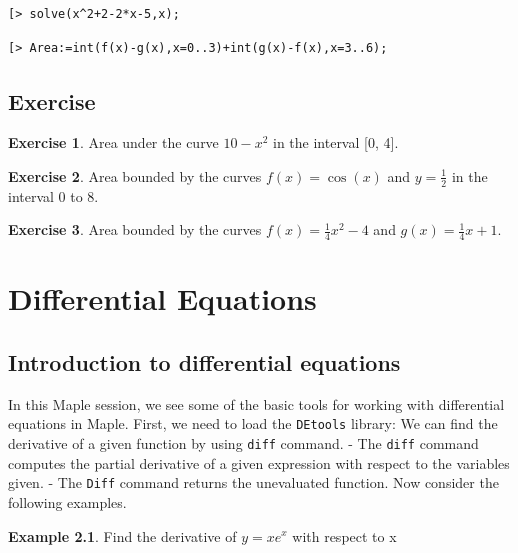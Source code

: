 \documentclass[
]{book}
\theoremstyle{definition}
\theoremstyle{definition}
\newtheorem{example}{Example}[chapter]
\theoremstyle{definition}
\newtheorem{exercise}{Exercise}[chapter]
\theoremstyle{definition}
\theoremstyle{remark}
\begin{document}
\begin{verbatim}
[> solve(x^2+2-2*x-5,x);
\end{verbatim}

\begin{verbatim}
[> Area:=int(f(x)-g(x),x=0..3)+int(g(x)-f(x),x=3..6);
\end{verbatim}

\section{Exercise}\label{exercise-5}

\begin{exercise}
\protect\hypertarget{exr:unnamed-chunk-32}{}\label{exr:unnamed-chunk-32}Area under the curve \(10 - x^2\) in the interval {[}0, 4{]}.
\end{exercise}

\begin{exercise}
\protect\hypertarget{exr:unnamed-chunk-33}{}\label{exr:unnamed-chunk-33}Area bounded by the curves \(f(x) = \cos(x)\) and \(y = \frac{1}{2}\) in the interval 0 to 8.
\end{exercise}

\begin{exercise}
\protect\hypertarget{exr:unnamed-chunk-34}{}\label{exr:unnamed-chunk-34}Area bounded by the curves \(f(x) = \frac{1}{4}x^2 - 4\) and \(g(x) = \frac{1}{4}x + 1\).
\end{exercise}

\chapter{Differential Equations}\label{differential-equations}

\section{Introduction to differential equations}\label{introduction-to-differential-equations}

In this Maple session, we see some of the basic tools for working with differential equations in Maple.
First, we need to load the \texttt{DEtools} library:
We can find the derivative of a given function by using \texttt{diff} command.
- The \texttt{diff} command computes the partial derivative of a given expression with respect to the variables given.
- The \texttt{Diff} command returns the unevaluated function. Now consider the following examples.

\begin{example}
\protect\hypertarget{exm:unnamed-chunk-35}{}\label{exm:unnamed-chunk-35}Find the derivative of \(y=xe^x\) with respect to x
\end{example}
\end{document}
